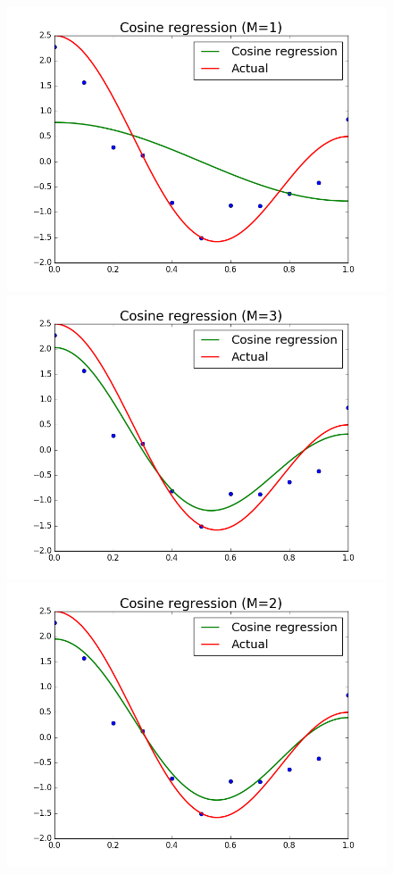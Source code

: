 \documentclass{article}
\begin{document}
\begin{figure}[width=\linewidth]
\centering
\begin{multicols}{2}
  \includegraphics[width=1.2\linewidth]{code/P2/cosine_regression,1.png}
  \includegraphics[width=1.2\linewidth]{code/P2/cosine_regression,3.png}
  \includegraphics[width=1.2\linewidth]{code/P2/cosine_regression,2.png}

\end{multicols}
\end{figure}
\end{document}
